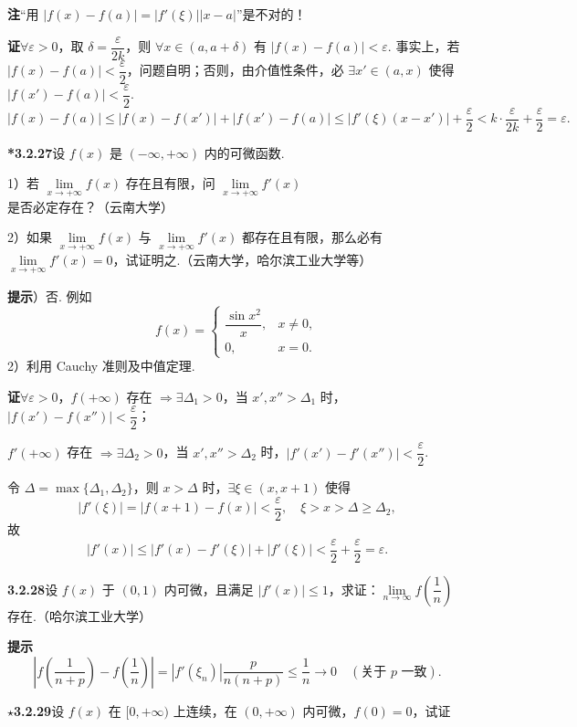 \documentclass[UTF8, 12pt, fontset=fandol, oneside]{ctexart}
\begin{document}
\noindent\textbf{注}\quad “用 $|f(x)-f(a)|=|f'(\xi)||x-a|$”是不对的！

\noindent\textbf{证}\quad $\forall \varepsilon>0$，取 $\delta=\dfrac{\varepsilon}{2k}$，则 $\forall x\in(a,a+\delta)$ 有 $|f(x)-f(a)|<\varepsilon$. 事实上，若 $|f(x)-f(a)|<\dfrac{\varepsilon}{2}$，问题自明；否则，由介值性条件，必 $\exists x'\in(a,x)$ 使得 $|f(x')-f(a)|<\dfrac{\varepsilon}{2}$.
\[
  |f(x)-f(a)|
  \le |f(x)-f(x')|+|f(x')-f(a)|
  \le |f'(\xi)(x-x')|+\frac{\varepsilon}{2}
  < k\cdot\frac{\varepsilon}{2k}+\frac{\varepsilon}{2}
  =\varepsilon.
\]

\noindent\textbf{*3.2.27}\quad 设 $f(x)$ 是 $(-\infty,+\infty)$ 内的可微函数.

1）若 $\lim\limits_{x\to+\infty} f(x)$ 存在且有限，问 $\lim\limits_{x\to+\infty} f'(x)$ 是否必定存在？（云南大学）

2）如果 $\lim\limits_{x\to+\infty} f(x)$ 与 $\lim\limits_{x\to+\infty} f'(x)$ 都存在且有限，那么必有 $\lim\limits_{x\to+\infty} f'(x)=0$，试证明之.（云南大学，哈尔滨工业大学等）

\noindent\textbf{提示}）否. 例如
\[
  f(x)=
  \begin{cases}
    \dfrac{\sin x^2}{x},& x\ne0,\\
    0,& x=0.
  \end{cases}
\]
2）利用 Cauchy 准则及中值定理.

\noindent\textbf{证}\quad $\forall\varepsilon>0$，$f(+\infty)$ 存在 $\Rightarrow\exists\Delta_1>0$，当 $x',x''>\Delta_1$ 时，$|f(x')-f(x'')|<\dfrac{\varepsilon}{2}$；

$f'(+\infty)$ 存在 $\Rightarrow\exists\Delta_2>0$，当 $x',x''>\Delta_2$ 时，$|f'(x')-f'(x'')|<\dfrac{\varepsilon}{2}$.

令 $\Delta=\max\{\Delta_1,\Delta_2\}$，则 $x>\Delta$ 时，$\exists \xi\in(x,x+1)$ 使得
\[
  |f'(\xi)|=|f(x+1)-f(x)|<\frac{\varepsilon}{2},\quad \xi>x>\Delta\ge\Delta_2,
\]
故
\[
  |f'(x)|\le |f'(x)-f'(\xi)|+|f'(\xi)|<\frac{\varepsilon}{2}+\frac{\varepsilon}{2}=\varepsilon.
\]

\noindent\textbf{3.2.28}\quad 设 $f(x)$ 于 $(0,1)$ 内可微，且满足 $|f'(x)|\le1$，求证：$\lim\limits_{n\to\infty}f\left(\dfrac1n\right)$ 存在.（哈尔滨工业大学）

\noindent\textbf{提示}\quad
\[
  \left|f\left(\frac1{n+p}\right)-f\left(\frac1n\right)\right|
  =|f'(\xi_n)|\frac{p}{n(n+p)}
  \le\frac1n\to0\quad(\text{关于 }p\text{ 一致}).
\]

\noindent\textbf{$\star$3.2.29}\quad 设 $f(x)$ 在 $[0,+\infty)$ 上连续，在 $(0,+\infty)$ 内可微，$f(0)=0$，试证
\end{document}
